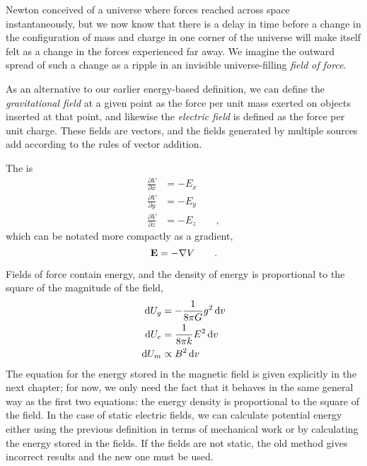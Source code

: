 	Newton conceived of a universe where forces reached across
	space instantaneously, but we now know that there is a delay
	in time before a change in the configuration of mass and
	charge in one corner of the universe will make itself felt
	as a change in the forces experienced far away. We imagine
	the outward spread of such a change as a ripple in an
	invisible universe-filling \emph{field of force}.
	
	As an alternative to our earlier energy-based definition, 
	we can define the \emph{gravitational field} at a given point as
	the force per unit mass exerted on objects inserted at that
	point, and likewise the \emph{electric field} is defined as
	the force per unit charge. These fields are vectors, and the
	fields generated by multiple sources add according to the
	rules of vector addition.
	
	The  is 
	\begin{align*}
		\frac{\partial V}{\partial x}	&= -E_x \\
		\frac{\partial V}{\partial y}	&= -E_y \\
		\frac{\partial V}{\partial z}	&= -E_z \qquad ,
	\end{align*}
	which can be notated more compactly as a gradient,
	\begin{equation*}
		\mathbf{E} = -\nabla V \qquad .
	\end{equation*}
	
	Fields of force contain energy, and the density of energy is
	proportional to the square of the magnitude of the field,
	\begin{align*}
		\operatorname{d\!} U_g	&= -\frac{1}{8\pi G}g^2 \operatorname{d\!} v \\
		\operatorname{d\!} U_e	&= \frac{1}{8\pi k}E^2 \operatorname{d\!} v \\
		\operatorname{d\!} U_m	&\propto B^2 \operatorname{d\!} v
	\end{align*}
	The equation for the energy stored in the magnetic field is given explicitly
	in the next chapter; for now, we only need the fact that it behaves in the
	same general way as the first two equations: the energy density is proportional
	to the square of the field.
	In the case of static electric fields, we can calculate potential energy
	either using the previous definition in terms of mechanical
	work or by calculating the energy stored in the fields. If
	the fields are not static, the old method gives incorrect
	results and the new one must be used.
	
